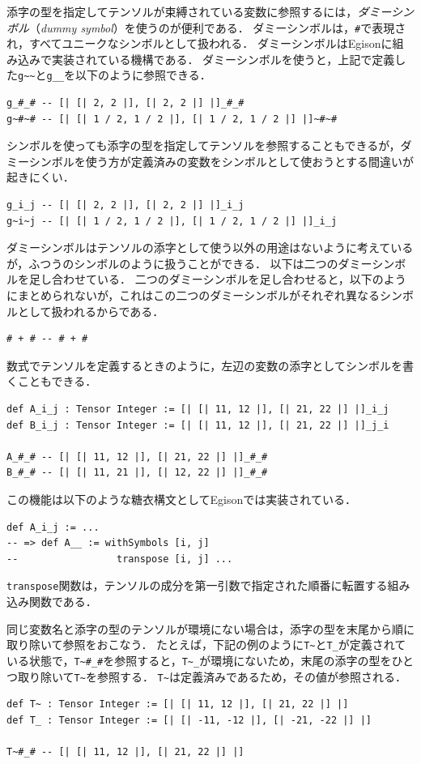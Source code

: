添字の型を指定してテンソルが束縛されている変数に参照するには，\emph{ダミーシンボル}（\emph{dummy symbol}）を使うのが便利である．
ダミーシンボルは，\lstinline{#}で表現され，すべてユニークなシンボルとして扱われる．
ダミーシンボルはEgisonに組み込みで実装されている機構である．
ダミーシンボルを使うと，上記で定義した\lstinline{g~~}と\lstinline{g__}を以下のように参照できる．
\begin{lstlisting}[language=egison,numbers=none]
g_#_# -- [| [| 2, 2 |], [| 2, 2 |] |]_#_#
g~#~# -- [| [| 1 / 2, 1 / 2 |], [| 1 / 2, 1 / 2 |] |]~#~#
\end{lstlisting}
シンボルを使っても添字の型を指定してテンソルを参照することもできるが，ダミーシンボルを使う方が定義済みの変数をシンボルとして使おうとする間違いが起きにくい．
\begin{lstlisting}[language=egison,numbers=none]
g_i_j -- [| [| 2, 2 |], [| 2, 2 |] |]_i_j
g~i~j -- [| [| 1 / 2, 1 / 2 |], [| 1 / 2, 1 / 2 |] |]_i_j
\end{lstlisting}

ダミーシンボルはテンソルの添字として使う以外の用途はないように考えているが，ふつうのシンボルのように扱うことができる．
以下は二つのダミーシンボルを足し合わせている．
二つのダミーシンボルを足し合わせると，以下のようにまとめられないが，これはこの二つのダミーシンボルがそれぞれ異なるシンボルとして扱われるからである．
\begin{lstlisting}[language=egison,numbers=none]
# + # -- # + #
\end{lstlisting}

数式でテンソルを定義するときのように，左辺の変数の添字としてシンボルを書くこともできる．
\begin{lstlisting}[language=egison,numbers=none]
def A_i_j : Tensor Integer := [| [| 11, 12 |], [| 21, 22 |] |]_i_j
def B_i_j : Tensor Integer := [| [| 11, 12 |], [| 21, 22 |] |]_j_i

A_#_# -- [| [| 11, 12 |], [| 21, 22 |] |]_#_#
B_#_# -- [| [| 11, 21 |], [| 12, 22 |] |]_#_#
\end{lstlisting}
この機能は以下のような糖衣構文としてEgisonでは実装されている．
\begin{lstlisting}[language=egison,numbers=none]
def A_i_j := ...
-- => def A__ := withSymbols [i, j]
--                 transpose [i, j] ...
\end{lstlisting}
\lstinline{transpose}関数は，テンソルの成分を第一引数で指定された順番に転置する組み込み関数である．

同じ変数名と添字の型のテンソルが環境にない場合は，添字の型を末尾から順に取り除いて参照をおこなう．
たとえば，下記の例のように\lstinline{T~}と\lstinline{T_}が定義されている状態で，\lstinline{T~#_#}を参照すると，\lstinline{T~_}が環境にないため，末尾の添字の型をひとつ取り除いて\lstinline{T~}を参照する．
\lstinline{T~}は定義済みであるため，その値が参照される．
\begin{lstlisting}[language=egison,numbers=none]
def T~ : Tensor Integer := [| [| 11, 12 |], [| 21, 22 |] |]
def T_ : Tensor Integer := [| [| -11, -12 |], [| -21, -22 |] |]

T~#_# -- [| [| 11, 12 |], [| 21, 22 |] |]
\end{lstlisting}


